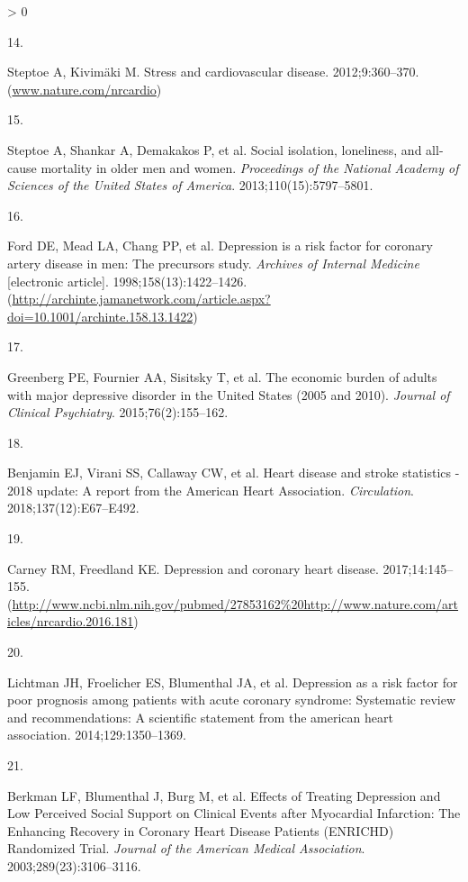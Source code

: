 \documentclass[
  11pt,
  openany]{book}
\newlength{\cslhangindent}
\newlength{\csllabelwidth}
\newenvironment{CSLReferences}[2] %
 {%
  \setlength{\parindent}{0pt}
  \ifodd #1 \everypar{\setlength{\hangindent}{\cslhangindent}}\ignorespaces\fi
  \ifnum #2 > 0
  \setlength{\parskip}{#2\baselineskip}
  \fi
 }%
 {}
\newcommand{\CSLLeftMargin}[1]{\parbox[t]{\csllabelwidth}{#1}}
\newcommand{\CSLRightInline}[1]{\parbox[t]{\linewidth - \csllabelwidth}{#1}\break}
\begin{document}
\begin{CSLReferences}{0}{0}
\leavevmode\hypertarget{ref-Steptoe2012}{}%
\CSLLeftMargin{14. }
\CSLRightInline{Steptoe A, Kivimäki M. {Stress and cardiovascular disease}. 2012;9:360--370. (\href{https://www.nature.com/nrcardio}{www.nature.com/nrcardio})}

\leavevmode\hypertarget{ref-Steptoe2013a}{}%
\CSLLeftMargin{15. }
\CSLRightInline{Steptoe A, Shankar A, Demakakos P, et al. {Social isolation, loneliness, and all-cause mortality in older men and women}. \emph{Proceedings of the National Academy of Sciences of the United States of America}. 2013;110(15):5797--5801. }

\leavevmode\hypertarget{ref-Ford1998}{}%
\CSLLeftMargin{16. }
\CSLRightInline{Ford DE, Mead LA, Chang PP, et al. {Depression is a risk factor for coronary artery disease in men: The precursors study}. \emph{Archives of Internal Medicine} {[}electronic article{]}. 1998;158(13):1422--1426. (\url{http://archinte.jamanetwork.com/article.aspx?doi=10.1001/archinte.158.13.1422})}

\leavevmode\hypertarget{ref-Greenberg2015b}{}%
\CSLLeftMargin{17. }
\CSLRightInline{Greenberg PE, Fournier AA, Sisitsky T, et al. {The economic burden of adults with major depressive disorder in the United States (2005 and 2010)}. \emph{Journal of Clinical Psychiatry}. 2015;76(2):155--162. }

\leavevmode\hypertarget{ref-Benjamin2018c}{}%
\CSLLeftMargin{18. }
\CSLRightInline{Benjamin EJ, Virani SS, Callaway CW, et al. {Heart disease and stroke statistics - 2018 update: A report from the American Heart Association}. \emph{Circulation}. 2018;137(12):E67--E492. }

\leavevmode\hypertarget{ref-Carney2017}{}%
\CSLLeftMargin{19. }
\CSLRightInline{Carney RM, Freedland KE. {Depression and coronary heart disease}. 2017;14:145--155. (\url{http://www.ncbi.nlm.nih.gov/pubmed/27853162\%20http://www.nature.com/articles/nrcardio.2016.181})}

\leavevmode\hypertarget{ref-Lichtman2014}{}%
\CSLLeftMargin{20. }
\CSLRightInline{Lichtman JH, Froelicher ES, Blumenthal JA, et al. {Depression as a risk factor for poor prognosis among patients with acute coronary syndrome: Systematic review and recommendations: A scientific statement from the american heart association}. 2014;129:1350--1369. }

\leavevmode\hypertarget{ref-Berkman2003}{}%
\CSLLeftMargin{21. }
\CSLRightInline{Berkman LF, Blumenthal J, Burg M, et al. {Effects of Treating Depression and Low Perceived Social Support on Clinical Events after Myocardial Infarction: The Enhancing Recovery in Coronary Heart Disease Patients (ENRICHD) Randomized Trial}. \emph{Journal of the American Medical Association}. 2003;289(23):3106--3116. }


\end{CSLReferences}
\end{document}
